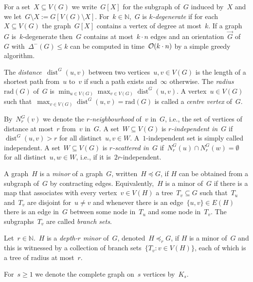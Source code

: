 \documentclass[11pt]{article}
\numberwithin{equation}{section}
\newcommand{\minor}{\preceq}
\newcommand{\st}{\mathrel : }
\newcommand{\N}{{\mathbb N}} \newcommand{\Q}{{\mathbb Q}}
\newcommand{\Oof}{\mbox{$\cal O$}}
\newcommand{\rad}{\mathrm{rad}}
\newcommand{\dist}{\operatorname{dist}}
\begin{document}
For a set~$X\subseteq V(G)$ we write~$G[X]$ for the subgraph of~$G$
induced by~$X$ and we let~$G\setminus X:=G[V(G)\setminus
X]$. For~$k\in\N$,~$G$ is \emph{$k$-degenerate} if for
each~$X\subseteq V(G)$ the graph~$G[X]$ contains a vertex of degree at
most~$k$. If a graph~$G$ is~$k$-degenerate then~$G$ contains at
most~$k\cdot n$ edges and an orientation~$\vec{G}$ of~$G$
with~$\Delta^-(G)\leq k$ can be computed in time~$\Oof(k\cdot n)$ by a
simple greedy algorithm.

The \emph{distance}~$\dist^G(u,v)$ between two vertices~$u,v\in V(G)$
is the length of a shortest path from~$u$ to~$v$ if such a path exists
and~$\infty$ otherwise. The \emph{radius}~$\rad(G)$ of~$G$
is $\min_{u\in V(G)}\max_{v\in V(G)}\dist^G(u,v)$. A vertex~$u\in
V(G)$ such that~$\max_{v\in V(G)}\dist^G(u,v)=\rad(G)$ is called a
\emph{centre vertex} of~$G$.

By~$N_r^G(v)$ we denote the \emph{$r$-neighbourhood} of~$v$ in~$G$,
i.e., the set of vertices of distance at most~$r$ from~$v$ in~$G$.  A
set~$W\subseteq V(G)$ is \emph{$r$-independent in~$G$} if
$\dist^G(u,v) > r$ for all distinct~$u,v\in W$. A~$1$-independent
set
is simply called independent.  A set~$W\subseteq V(G)$ is
\emph{$r$-scattered in~$G$} if~$N_r^G(u)\cap N_r^G(w)=\emptyset$ for
all distinct~$u,w\in W$, i.e., if it is~$2r$-independent.

A graph~$H$ is a \emph{minor} of a graph~$G$, written~$H \minor G$, if
$H$ can be obtained from a subgraph of~$G$ by contracting
edges. Equivalently,~$H$ is a minor of~$G$ if there is a map that
associates with every vertex~$v \in V(H)$ a tree~$T_v \subseteq G$
such that~$T_u$ and~$T_v$ are disjoint for~$u \neq v$ and whenever
there is an edge~$\{u, v\} \in E(H)$ there is an edge in~$G$ between
some node in~$T_u$ and some node in~$T_v$.  The subgraphs~$T_v$ are
called \emph{branch sets}. 

Let~$r\in\N$.~$H$ is a \emph{depth-$r$ minor} of~$G$, denoted~$H
\minor_r G$, if $H$ is a minor of~$G$ and this is witnessed by a
collection of branch sets~$\{ T_v \st v \in V(H) \}$, each of which is
a tree of radius at most~$r$.

For~$s\geq 1$ we denote the complete graph on~$s$ vertices by~$K_s$.

\smallskip
\end{document}
